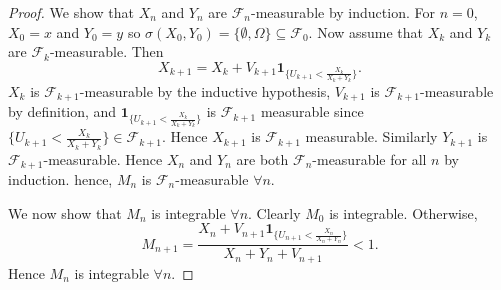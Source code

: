 \documentclass{article}
\begin{document}
\begin{proof}
We show that $X_n$ and $Y_n$ are $\mathcal{F}_n$-measurable by induction. For $n=0$, $X_0=x$ and $Y_0=y$ so $\sigma(X_0,Y_0)=\{\emptyset,\Omega\}\subseteq\mathcal{F}_0$. Now assume that $X_k$ and $Y_k$ are $\mathcal{F}_k$-measurable. Then \[X_{k+1}=X_k+V_{k+1}\mathbf{1}_{\{U_{k+1}<\frac{X_k}{X_k+Y_k}\}}.\] $X_k$ is $\mathcal{F}_{k+1}$-measurable by the inductive hypothesis, $V_{k+1}$ is $\mathcal{F}_{k+1}$-measurable by definition, and $\mathbf{1}_{\{U_{k+1}<\frac{X_k}{X_k+Y_k}\}}$ is $\mathcal{F}_{k+1}$ measurable since $\{U_{k+1}<\frac{X_k}{X_k+Y_k}\}\in\mathcal{F}_{k+1}$. Hence $X_{k+1}$ is $\mathcal{F}_{k+1}$ measurable. Similarly $Y_{k+1}$ is $\mathcal{F}_{k+1}$-measurable. Hence $X_n$ and $Y_n$ are both $\mathcal{F}_n$-measurable for all $n$ by induction. hence, $M_n$ is $\mathcal{F}_{n}$-measurable $\forall n$.

We now show that $M_n$ is integrable $\forall n$. Clearly $M_0$ is integrable. Otherwise,\[M_{n+1}=\frac{X_n+V_{n+1}\mathbf{1}_{\{U_{n+1}<\frac{X_n}{X_n+Y_n}\}}}{X_n+Y_n+V_{n+1}}<1.\] Hence $M_n$ is integrable $\forall n$.


\end{proof}
\end{document}
